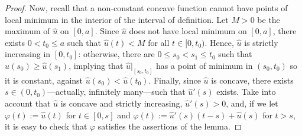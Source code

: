 \documentclass[12pt]{amsart}
\theoremstyle{definition}
\theoremstyle{remark}
\numberwithin{equation}{section}
\def\R{\mathbb R}
\begin{document}
\begin{proof}

Now, recall that a non-constant concave function cannot have points of local minimum in the interior of the interval of definition. Let $M>0$ be the maximum  of $\hat u$ on $[0,a]$.  Since $\hat u$ does not have local minimum on $[0,a]$, there exists $0<t_0\leq a$  such that $\hat u(t)<M$ for all $t\in [0, t_0)$. Hence, $\hat u$ is strictly increasing in $[0, t_0]$: otherwise, there are  $0\leq s_0 < s_1\leq t_0$ such that $\hat u(s_0)\geq \hat u(s_1)$, implying that $\hat u|_{[s_0, t_0]}$ has a point of minimum in $(s_0, t_0)$ so it is constant, against  $\hat u(s_0)<\hat u(t_0)$. Finally, since $\hat u$ is concave, there exists $s\in (0,t_0)$---actually, infinitely many---such that $\hat u'(s)$ exists. Take into account that $\hat u$ is concave and strictly increasing, $\hat u'(s) > 0$, and, if we let $\varphi(t) := \hat u(t)$ for $t \in [0, s]$ and $\varphi(t) := \hat u'(s)(t - s) + \hat u(s)$ for $t>s$, it is easy to check that $\varphi$ satisfies the assertions of the lemma.
\end{proof}
\end{document}
